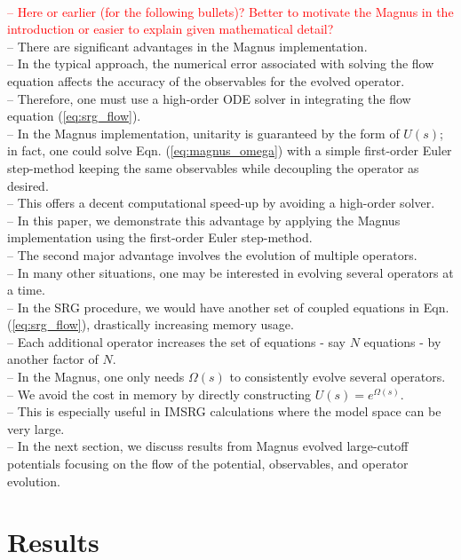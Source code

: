 \documentclass[preprintnumbers,floatfix,aps,prc,preprint,nofootinbib]{revtex4-1}
\begin{document}
\\
\textcolor{red}{%
-- Here or earlier (for the following bullets)? Better to motivate the Magnus in the introduction or easier to explain given mathematical detail?
}
\\
-- There are significant advantages in the Magnus implementation.
\\
-- In the typical approach, the numerical error associated with solving the flow equation affects the accuracy of the observables for the evolved operator.
\\
-- Therefore, one must use a high-order ODE solver in integrating the flow equation (\ref{eq:srg_flow}).
\\
-- In the Magnus implementation, unitarity is guaranteed by the form of $U(s)$; in fact, one could solve Eqn. (\ref{eq:magnus_omega}) with a simple first-order Euler step-method keeping the same observables while decoupling the operator as desired.
\\
-- This offers a decent computational speed-up by avoiding a high-order solver.
\\
-- In this paper, we demonstrate this advantage by applying the Magnus implementation using the first-order Euler step-method.
\\
-- The second major advantage involves the evolution of multiple operators.
\\
-- In many other situations, one may be interested in evolving several operators at a time.
\\
-- In the SRG procedure, we would have another set of coupled equations in Eqn. (\ref{eq:srg_flow}), drastically increasing memory usage.
\\
-- Each additional operator increases the set of equations - say $N$ equations - by another factor of $N$.
\\
-- In the Magnus, one only needs $\Omega(s)$ to consistently evolve several operators.
\\
-- We avoid the cost in memory by directly constructing $U(s)=e^{\Omega(s)}$.
\\
-- This is especially useful in IMSRG calculations where the model space can be very large.
\\
-- In the next section, we discuss results from Magnus evolved large-cutoff potentials focusing on the flow of the potential, observables, and operator evolution.


\section{Results}
\label{sec:results}
\end{document}
